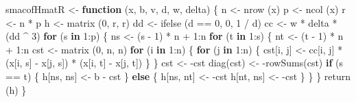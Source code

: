 \documentclass[
  12pt,
]{book}
\newenvironment{Shaded}{\begin{snugshade}}{\end{snugshade}}
\newcommand{\ControlFlowTok}[1]{\textcolor[rgb]{0.13,0.29,0.53}{\textbf{#1}}}
\newcommand{\DecValTok}[1]{\textcolor[rgb]{0.00,0.00,0.81}{#1}}
\newcommand{\FunctionTok}[1]{\textcolor[rgb]{0.00,0.00,0.00}{#1}}
\newcommand{\NormalTok}[1]{#1}
\newcommand{\OtherTok}[1]{\textcolor[rgb]{0.56,0.35,0.01}{#1}}
\newcommand{\SpecialCharTok}[1]{\textcolor[rgb]{0.00,0.00,0.00}{#1}}
\theoremstyle{definition}
\theoremstyle{definition}
\theoremstyle{definition}
\theoremstyle{definition}
\theoremstyle{remark}
\begin{document}
\begin{Shaded}
\begin{Highlighting}[]
\NormalTok{smacofHmatR }\OtherTok{\textless{}{-}} \ControlFlowTok{function}\NormalTok{ (x, b, v, d, w, delta) \{}
\NormalTok{  n }\OtherTok{\textless{}{-}} \FunctionTok{nrow}\NormalTok{ (x)}
\NormalTok{  p }\OtherTok{\textless{}{-}} \FunctionTok{ncol}\NormalTok{ (x)}
\NormalTok{  r }\OtherTok{\textless{}{-}}\NormalTok{ n }\SpecialCharTok{*}\NormalTok{ p}
\NormalTok{  h }\OtherTok{\textless{}{-}} \FunctionTok{matrix}\NormalTok{ (}\DecValTok{0}\NormalTok{, r, r)}
\NormalTok{  dd }\OtherTok{\textless{}{-}} \FunctionTok{ifelse}\NormalTok{ (d }\SpecialCharTok{==} \DecValTok{0}\NormalTok{, }\DecValTok{0}\NormalTok{, }\DecValTok{1} \SpecialCharTok{/}\NormalTok{ d)}
\NormalTok{  cc }\OtherTok{\textless{}{-}}\NormalTok{ w }\SpecialCharTok{*}\NormalTok{ delta }\SpecialCharTok{*}\NormalTok{ (dd }\SpecialCharTok{\^{}} \DecValTok{3}\NormalTok{)}
  \ControlFlowTok{for}\NormalTok{ (s }\ControlFlowTok{in} \DecValTok{1}\SpecialCharTok{:}\NormalTok{p) \{}
\NormalTok{    ns }\OtherTok{\textless{}{-}}\NormalTok{ (s }\SpecialCharTok{{-}} \DecValTok{1}\NormalTok{) }\SpecialCharTok{*}\NormalTok{ n }\SpecialCharTok{+} \DecValTok{1}\SpecialCharTok{:}\NormalTok{n}
    \ControlFlowTok{for}\NormalTok{ (t }\ControlFlowTok{in} \DecValTok{1}\SpecialCharTok{:}\NormalTok{s) \{}
\NormalTok{      nt }\OtherTok{\textless{}{-}}\NormalTok{ (t }\SpecialCharTok{{-}} \DecValTok{1}\NormalTok{) }\SpecialCharTok{*}\NormalTok{ n }\SpecialCharTok{+} \DecValTok{1}\SpecialCharTok{:}\NormalTok{n}
\NormalTok{      cst }\OtherTok{\textless{}{-}} \FunctionTok{matrix}\NormalTok{ (}\DecValTok{0}\NormalTok{, n, n)}
      \ControlFlowTok{for}\NormalTok{ (i }\ControlFlowTok{in} \DecValTok{1}\SpecialCharTok{:}\NormalTok{n) \{}
        \ControlFlowTok{for}\NormalTok{ (j }\ControlFlowTok{in} \DecValTok{1}\SpecialCharTok{:}\NormalTok{n) \{}
\NormalTok{          cst[i, j] }\OtherTok{\textless{}{-}}\NormalTok{ cc[i, j] }\SpecialCharTok{*}\NormalTok{ (x[i, s] }\SpecialCharTok{{-}}\NormalTok{ x[j, s]) }\SpecialCharTok{*}\NormalTok{ (x[i, t] }\SpecialCharTok{{-}}\NormalTok{ x[j, t])}
\NormalTok{        \}}
\NormalTok{      \}}
\NormalTok{      cst }\OtherTok{\textless{}{-}} \SpecialCharTok{{-}}\NormalTok{cst}
      \FunctionTok{diag}\NormalTok{(cst) }\OtherTok{\textless{}{-}} \SpecialCharTok{{-}}\FunctionTok{rowSums}\NormalTok{(cst)}
      \ControlFlowTok{if}\NormalTok{ (s }\SpecialCharTok{==}\NormalTok{ t) \{}
\NormalTok{        h[ns, ns] }\OtherTok{\textless{}{-}}\NormalTok{ b }\SpecialCharTok{{-}}\NormalTok{ cst}
\NormalTok{      \} }\ControlFlowTok{else}\NormalTok{ \{}
\NormalTok{        h[ns, nt] }\OtherTok{\textless{}{-}} \SpecialCharTok{{-}}\NormalTok{cst}
\NormalTok{        h[nt, ns] }\OtherTok{\textless{}{-}} \SpecialCharTok{{-}}\NormalTok{cst}
\NormalTok{      \}}
\NormalTok{    \}}
\NormalTok{  \}}
  \FunctionTok{return}\NormalTok{ (h)}
\NormalTok{\}}


\end{Highlighting}
\end{Shaded}
\end{document}
